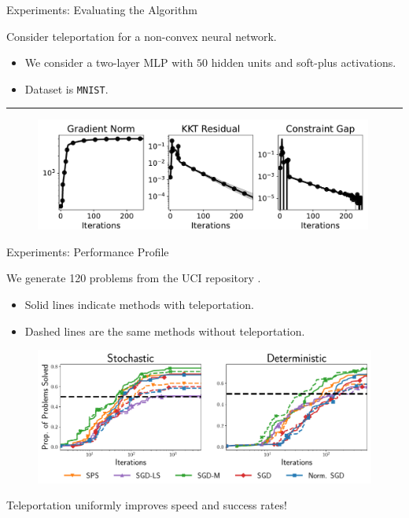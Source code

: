 \documentclass[usenames,dvipsnames,mathserif,notheorems]{beamer}
\newcommand{\horizontalrule}{
	{
			\vspace{-0.5em}
			\center \rule{\textwidth}{0.1em}
			\vspace{-0.2em}
		}
}
\newcommand{\bad}[1]{\textcolor{bad}{#1}}
\newcommand{\good}[1]{\textcolor{good}{#1}}
\begin{document}
\begin{frame}{Experiments: Evaluating the Algorithm}

    Consider teleportation for a \bad{non-convex} neural network.
    \begin{itemize}
        \pause
        \item We consider a two-layer MLP with \( 50 \) hidden units and soft-plus activations.
              \pause
        \item Dataset is \texttt{MNIST}.
    \end{itemize}
    \pause
    \horizontalrule

    \begin{figure}
        \centering
        \includegraphics[width=0.99\textwidth]{assets/teleport_metrics_combined.pdf}
    \end{figure}

\end{frame}

\begin{frame}{Experiments: Performance Profile}

    We generate 120 problems from the UCI repository \citep{asuncion2007uci}.
    \begin{itemize}
        \pause
        \item Solid lines indicate methods \good{with teleportation}.
              \pause
        \item Dashed lines are the same methods \bad{without teleportation}.
    \end{itemize}
    \pause

    \begin{figure}
        \centering
        \includegraphics[width=1.0\textwidth]{assets/network_profile.pdf}
    \end{figure}

    \pause

    Teleportation \good{uniformly improves} speed and success rates!
\end{frame}
\end{document}
